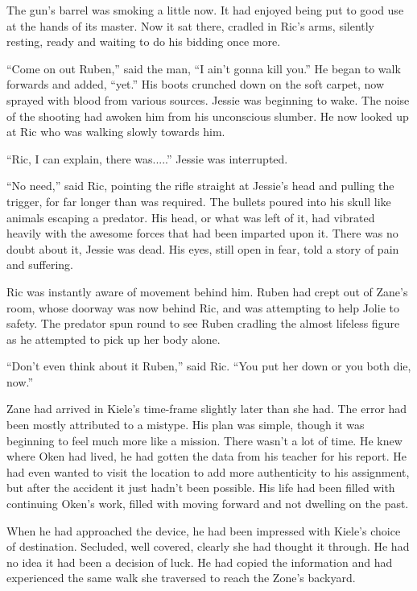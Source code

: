 The gun's barrel was smoking a little now.  It had enjoyed being put to good use at the hands of its master.  Now it sat there, cradled in Ric's arms, silently resting, ready and waiting to do his bidding once more.  

``Come on out Ruben,'' said the man, ``I ain't gonna kill you.''  He began to walk forwards and added, ``yet.''  His boots crunched down on the soft carpet, now sprayed with blood from various sources.  Jessie was beginning to wake.  The noise of the shooting had awoken him from his unconscious slumber.  He now looked up at Ric who was walking slowly towards him.

``Ric, I can explain, there was.....''  Jessie was interrupted.

``No need,'' said Ric, pointing the rifle straight at Jessie's head and pulling the trigger, for far longer than was required.  The bullets poured into his skull like animals escaping a predator.  His head, or what was left of it, had vibrated heavily with the awesome forces that had been imparted upon it.  There was no doubt about it, Jessie was dead.  His eyes, still open in fear, told a story of pain and suffering.  

Ric was instantly aware of movement behind him.  Ruben had crept out of Zane's room, whose doorway was now behind Ric, and was attempting to help Jolie to safety.  The predator spun round to see Ruben cradling the almost lifeless figure as he attempted to pick up her body alone.

``Don't even think about it Ruben,'' said Ric.  ``You put her down or you both die, now.''



\thoughtbreak



Zane had arrived in Kiele's time-frame slightly later than she had.  The error had been mostly attributed to a mistype.  His plan was simple, though it was beginning to feel much more like a mission.  There wasn't a lot of time.  He knew where Oken had lived, he had gotten the data from his teacher for his report.  He had even wanted to visit the location to add more authenticity to his assignment, but after the accident it just hadn't been possible.  His life had been filled with continuing Oken's work, filled with moving forward and not dwelling on the past.  

When he had approached the device, he had been impressed with Kiele's choice of destination.  Secluded, well covered, clearly she had thought it through.  He had no idea it had been a decision of luck.  He had copied the information and had experienced the same walk she traversed to reach the Zone's backyard.

